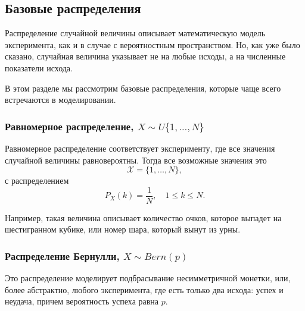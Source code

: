 \documentclass[a4paper,12pt]{article}
\renewcommand{\le}{\leqslant}
\newcounter{z-counter}
\newcounter{th-counter}
\begin{document}
\subsection*{Базовые распределения}
Распределение случайной величины описывает математическую модель эксперимента, как и в случае с вероятностным пространством. Но, как уже было сказано, случайная величина указывает не на любые исходы, а на численные показатели исхода.

В этом разделе мы рассмотрим базовые распределения, которые чаще всего встречаются в моделировании.

\subsubsection*{Равномерное распределение, $X \sim U\{1, \ldots, N\}$}

Равномерное распределение соответствует эксперименту, где все значения случайной величины равновероятны. Тогда все возможные значения это
\[
\mathcal{X} = \{1, \ldots, N\},
\]
с распределением
\[
P_X(k) = \frac{1}{N}, \quad 1\le k \le N.
\]
\begin{center}
\end{center}

Например, такая величина описывает количество очков, которое выпадет на шестигранном кубике, или номер шара, который вынут из урны.

\subsubsection*{Распределение Бернулли, $X \sim Bern(p)$}
Это распределение моделирует подбрасывание несимметричной монетки, или, более абстрактно, любого эксперимента, где есть только два исхода: успех и неудача, причем вероятность успеха равна $p$.
\end{document}
